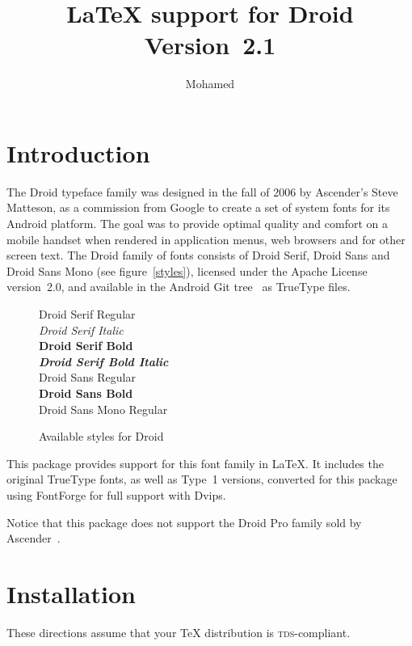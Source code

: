 \documentclass{article}
\title{\LaTeX{} support for Droid\\Version~2.1}
\author{Mohamed \name{El~Morabity}\\\email{melmorabity@fedoraproject.org}}
\newcommand{\acronym}[1]{\textsc{\lowercase{#1}}}
\newcommand{\name}{}
\newcommand{\program}{}
\begin{document}
\maketitle

\tableofcontents

\section{Introduction}

The Droid typeface family was designed in the fall of 2006 by Ascender's Steve
\name{Matteson}, as a commission from Google to create a set of system fonts for
its Android platform. The goal was to provide optimal quality and comfort on a
mobile handset when rendered in application menus, web browsers and for other
screen text. The Droid family of fonts consists of {\fdrfamily Droid Serif},
{\fdsfamily Droid Sans} and {\fdmfamily Droid Sans Mono} (see
figure~\vref{styles}), licensed under the Apache License version~2.0, and
available in the Android \program{Git} tree~\cite{droid} as TrueType files.

\begin{figure}
  \centering
  {%
    \fdrfamily%
    Droid Serif Regular\\
    {\itshape Droid Serif Italic}\\
    {\bfseries Droid Serif Bold}\\
    {\bfseries\itshape Droid Serif Bold Italic}\\
  }
  {%
    \fdsfamily%
    Droid Sans Regular\\
    {\bfseries Droid Sans Bold}\\
  }
  {%
    \fdmfamily%
    Droid Sans Mono Regular
  }
  \caption{Available styles for Droid}
  \label{styles}
\end{figure}

This package provides support for this font family in \LaTeX{}. It includes the
original TrueType fonts, as well as Type~1 versions, converted for this package
using \program{FontForge} for full support with \program{Dvips}.

Notice that this package does not support the Droid Pro family sold by
Ascender~\cite{droidpro}.

\section{Installation}

These directions assume that your \TeX{} distribution is
\acronym{TDS}-compliant.
\end{document}
